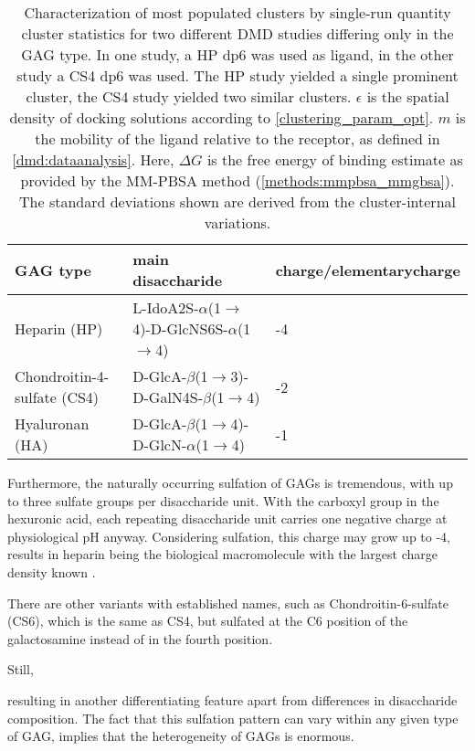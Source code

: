 \begin{table}
\scriptsize
\centering
\renewcommand{\arraystretch}{1.3}
\begin{tabular}{lll}
\midrule
GAG type & main disaccharide & charge/\si{elementarycharge} \\
\midrule
Heparin (HP) & L-IdoA2S-$\alpha$(1$\rightarrow$4)-D-GlcNS6S-$\alpha$(1$\rightarrow$4) & -4 \\
Chondroitin-4-sulfate (CS4) & D-GlcA-$\beta$(1$\rightarrow$3)-D-GalN4S-$\beta$(1$\rightarrow$4) & -2 \\
Hyaluronan (HA) & D-GlcA-$\beta$(1$\rightarrow$4)-D-GlcN-$\alpha$(1$\rightarrow$4) & -1 \\
\midrule
\end{tabular}
\caption{
Characterization of most populated clusters by single-run quantity cluster
statistics for two different DMD studies differing only in the GAG type. In one
study, a HP dp6 was used as ligand, in the other study a CS4 dp6 was used. The
HP study yielded a single prominent cluster, the CS4 study yielded two similar
clusters. $\epsilon$ is the spatial density of docking solutions according to
\cref{clustering_param_opt}. $m$ is the mobility of the ligand relative to the
receptor, as defined in \cref{dmd:dataanalysis}. Here, $\Delta G$ is the free
energy of binding estimate as provided by the MM-PBSA method
(\cref{methods:mmpbsa_mmgbsa}). The standard deviations shown are derived from
the cluster-internal variations.}
\label{tab:bg:gagtypes}
\end{table}



Furthermore, the naturally occurring sulfation of GAGs is tremendous, with up to
three sulfate groups per disaccharide unit. With the carboxyl group in the
hexuronic acid, each repeating disaccharide unit carries one negative charge at
physiological pH anyway. Considering sulfation, this charge may grow up to -4,
results in heparin being the biological macromolecule with the largest charge
density known \cite{capila_linhardt_hep_prot_2002}.


There are other variants with established names, such as Chondroitin-6-sulfate (CS6), which is the same as CS4, but sulfated at the C6 position of the galactosamine instead of in the fourth position.


Still,


 resulting in another differentiating feature apart from differences in disaccharide composition. The fact that this sulfation pattern can vary within any given type of GAG, implies that the heterogeneity of GAGs is enormous.



